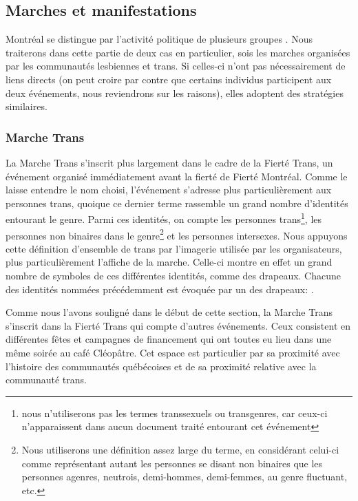 \subsection{Marches et manifestations}
\label{subsec:label}
 Montréal se distingue par l'activité politique de plusieurs groupes \lgbt{}.
Nous traiterons dans cette partie de deux cas en particulier, sois les marches organisées par les communautés lesbiennes et trans. 
Si celles-ci n'ont pas nécessairement de liens directs (on peut croire par contre que certains individus participent aux deux événements, nous reviendrons sur les raisons), elles adoptent des stratégies similaires.

\subsubsection{Marche Trans}
\label{subsubsec:marchetrans}
La Marche Trans s'inscrit plus largement dans le cadre de la Fierté Trans, un événement organisé immédiatement avant la fierté de Fierté Montréal. 
Comme le laisse entendre le nom choisi, l'événement s'adresse plus particulièrement aux personnes trans, quoique ce dernier terme rassemble un grand nombre d'identités entourant le genre. 
Parmi ces identités, on compte les personnes trans\footnote{nous n'utiliserons pas les termes transsexuels ou transgenres, car ceux-ci n'apparaissent dans aucun document traité entourant cet événement}, les personnes non binaires dans le genre\footnote{Nous utiliserons une définition assez large du terme, en   considérant celui-ci comme représentant autant les personnes se disant   non binaires que les personnes agenres, neutrois, demi-hommes, demi-femmes,   au genre fluctuant, etc.\citep[see][]{Barker2015}} et les personnes intersexes. 
Nous appuyons cette définition d'ensemble de trans par l'imagerie utilisée par les organisateurs, plus particulièrement l'affiche de la marche.
Celle-ci montre en effet un grand nombre de symboles de ces différentes identités, comme des drapeaux. 
Chacune des identités nommées précédemment est évoquée par un des drapeaux: .

Comme nous l'avons souligné dans le début de cette section, la Marche Trans s'inscrit dans la Fierté Trans qui compte d'autres événements. 
Ceux consistent en différentes fêtes et campagnes de financement qui ont toutes eu lieu dans une même soirée au café Cléopâtre. 
Cet espace est particulier par sa proximité avec l'histoire des communautés \lgbt{} québécoises et de sa proximité relative avec la communauté trans.

